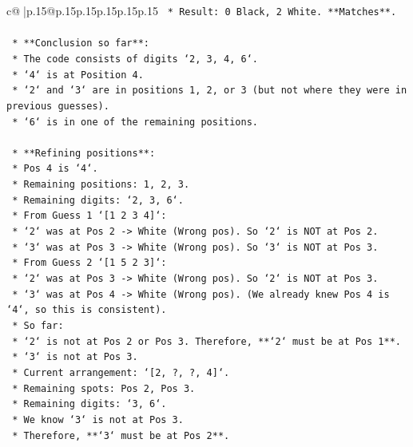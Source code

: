 \documentclass{article}
\begin{document}
{\begin{supertabular}{c@{$\;$}|p{.15\linewidth}@{}p{.15\linewidth}p{.15\linewidth}p{.15\linewidth}p{.15\linewidth}p{.15\linewidth}}
{{{\texttt{                *   Result: 0 Black, 2 White. **Matches**.} \\
\\ 
\texttt{    *   **Conclusion so far**:} \\
\texttt{        *   The code consists of digits `2, 3, 4, 6`.} \\
\texttt{        *   `4` is at Position 4.} \\
\texttt{        *   `2` and `3` are in positions 1, 2, or 3 (but not where they were in previous guesses).} \\
\texttt{        *   `6` is in one of the remaining positions.} \\
\\ 
\texttt{    *   **Refining positions**:} \\
\texttt{        *   Pos 4 is `4`.} \\
\texttt{        *   Remaining positions: 1, 2, 3.} \\
\texttt{        *   Remaining digits: `2, 3, 6`.} \\
\texttt{        *   From Guess 1 `{[}1 2 3 4{]}`:} \\
\texttt{            *   `2` was at Pos 2 {-}> White (Wrong pos). So `2` is NOT at Pos 2.} \\
\texttt{            *   `3` was at Pos 3 {-}> White (Wrong pos). So `3` is NOT at Pos 3.} \\
\texttt{        *   From Guess 2 `{[}1 5 2 3{]}`:} \\
\texttt{            *   `2` was at Pos 3 {-}> White (Wrong pos). So `2` is NOT at Pos 3.} \\
\texttt{            *   `3` was at Pos 4 {-}> White (Wrong pos). (We already knew Pos 4 is `4`, so this is consistent).} \\
\texttt{        *   So far:} \\
\texttt{            *   `2` is not at Pos 2 or Pos 3. Therefore, **`2` must be at Pos 1**.} \\
\texttt{            *   `3` is not at Pos 3.} \\
\texttt{        *   Current arrangement: `{[}2, ?, ?, 4{]}`.} \\
\texttt{        *   Remaining spots: Pos 2, Pos 3.} \\
\texttt{        *   Remaining digits: `3, 6`.} \\
\texttt{        *   We know `3` is not at Pos 3.} \\
\texttt{        *   Therefore, **`3` must be at Pos 2**.} \\
}}}
\end{supertabular}}
\end{document}
